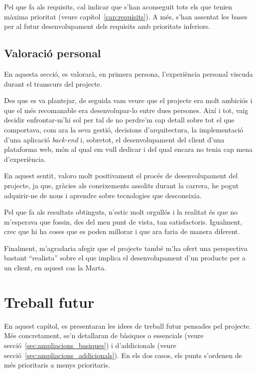 \documentclass[a4paper,12pt]{ThesisStyle}
\begin{document}
Pel que fa als requisits, cal indicar que s'han aconseguit tots els que tenien màxima prioritat (veure capítol~\ref{cap:requisits}). A més, s'han assentat les bases per al futur desenvolupament dels requisits amb prioritats inferiors.

\section{Valoració personal}
\label{sec:valoracio}

En aquesta secció, es valorarà, en primera persona, l'experiència personal viscuda durant el transcurs del projecte.

Des que es va plantejar, de seguida vam veure que el projecte era molt ambiciós i que el més recomanable era desenvolupar-lo entre dues persones. Així i tot, vaig decidir enfrontar-m'hi sol per tal de no perdre'm cap detall sobre tot el que comportava, com ara la seva gestió, decisions d'arquitectura, la implementació d'una aplicació \textit{back-end} i, sobretot, el desenvolupament del client d'una plataforma web, món al qual em vull dedicar i del qual encara no tenia cap mena d'experiència.

En aquest sentit, valoro molt positivament el procés de desenvolupament del projecte, ja que, gràcies als coneixements assolits durant la carrera, he pogut adquirir-ne de nous i aprendre sobre tecnologies que desconeixia.

Pel que fa als resultats obtinguts, n'estic molt orgullós i la realitat és que no m'esperava que fossin, des del meu punt de vista, tan satisfactoris. Igualment, crec que hi ha coses que es poden millorar i que ara faria de manera diferent.

Finalment, m'agradaria afegir que el projecte també m'ha ofert una perspectiva bastant ``realista'' sobre el que implica el desenvolupament d'un producte per a un client, en aquest cas la Marta.


\chapter{Treball futur}
\label{cap:treball_futur}

En aquest capítol, es presentaran les idees de treball futur pensades pel projecte. Més concretament, se'n detallaran de bàsiques o essencials (veure secció~\ref{sec:ampliacions_basiques}) i d'addicionals (veure secció~\ref{sec:ampliacions_addicionals}). En els dos casos, els punts s'ordenen de més prioritaris a menys prioritaris.
\end{document}
